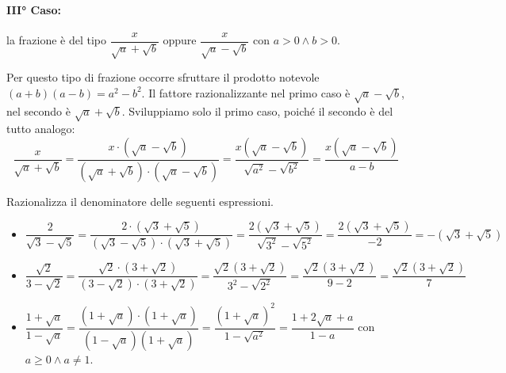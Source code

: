 \paragraph{III° Caso:} 
la frazione è del tipo $\dfrac x{\sqrt a+\sqrt b}$ 
oppure $\dfrac x{\sqrt a-\sqrt b}$ con $a>0 \wedge b>0$.

Per questo tipo di frazione occorre sfruttare il prodotto notevole 
$(a+b)(a-b)=a^2-b^2$. Il fattore razionalizzante nel primo caso è $\sqrt a-\sqrt b$, nel secondo è $\sqrt a+\sqrt b$.
Sviluppiamo solo il primo caso, poiché il secondo è del tutto analogo:
\begin{equation*}
\dfrac x{\sqrt a+\sqrt b}=
\dfrac{x\cdot (\sqrt a-\sqrt b)}{(\sqrt a+\sqrt b)\cdot (\sqrt a-\sqrt b)}=
\dfrac{x(\sqrt a-\sqrt b)}{\sqrt{a^2}-\sqrt{b^2}}=
\dfrac{x(\sqrt a-\sqrt b)}{a-b}
\end{equation*}

\begin{exrig}
 \begin{esempio}
Razionalizza il denominatore delle seguenti espressioni.
\begin{itemize}
 \item $\dfrac 2{\sqrt 3-\sqrt 5}=
 \dfrac{2\cdot (\sqrt 3+\sqrt 5)}{(\sqrt 3-\sqrt 5)\cdot (\sqrt 3+\sqrt 5)}=
 \dfrac{2(\sqrt 3+\sqrt 5)}{\sqrt{3^2}-\sqrt{5^2}}=
 \dfrac{2(\sqrt 3+\sqrt 5)}{-2}=-(\sqrt 3+\sqrt 5)$
 \item $\dfrac{\sqrt 2}{3-\sqrt 2}=
 \dfrac{\sqrt 2\cdot (3+\sqrt 2)}{(3-\sqrt 2)\cdot (3+\sqrt 2)}=
 \dfrac{\sqrt 2(3+\sqrt 2)}{3^2-\sqrt{2^2}}=\dfrac{\sqrt 2(3+\sqrt 2)}{9-2}=
 \dfrac{\sqrt 2(3+\sqrt 2)} 7$
 \item $\dfrac{1+\sqrt a}{1-\sqrt a}=
 \dfrac{(1+\sqrt a)\cdot (1+\sqrt a)}{(1-\sqrt a)(1+\sqrt a)}=
 \dfrac{(1+\sqrt a)^2}{1-\sqrt{a^2}}=\dfrac{1+2\sqrt a+a}{1-a}$ 
 con $a\ge 0\wedge a\neq 1$.
\end{itemize}
 \end{esempio}
\end{exrig}

